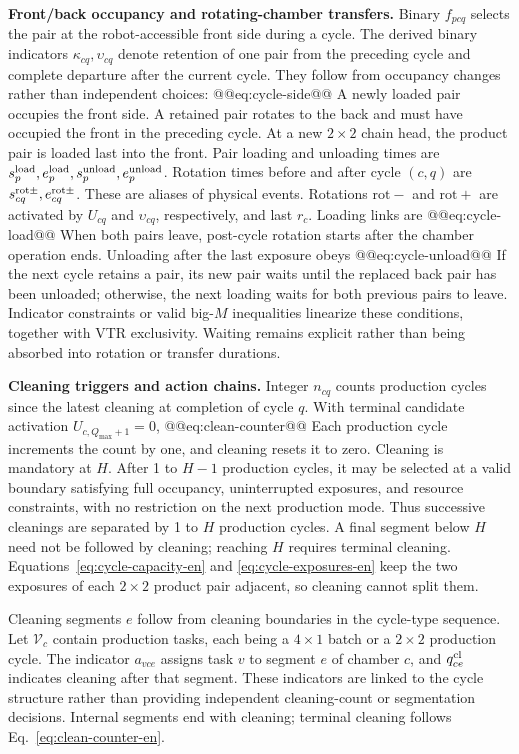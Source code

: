 \noindent\textbf{Front/back occupancy and rotating-chamber transfers.}
Binary $f_{pcq}$ selects the pair at the robot-accessible front side during a cycle. The derived binary indicators $\kappa_{cq},\upsilon_{cq}$ denote retention of one pair from the preceding cycle and complete departure after the current cycle. They follow from occupancy changes rather than independent choices:
@@eq:cycle-side@@
A newly loaded pair occupies the front side. A retained pair rotates to the back and must have occupied the front in the preceding cycle. At a new $2\times2$ chain head, the product pair is loaded last into the front. Pair loading and unloading times are $s_p^{\rm load},e_p^{\rm load},s_p^{\rm unload},e_p^{\rm unload}$. Rotation times before and after cycle $(c,q)$ are $s_{cq}^{\rm rot\pm},e_{cq}^{\rm rot\pm}$. These are aliases of physical events. Rotations $\mathrm{rot-}$ and $\mathrm{rot+}$ are activated by $U_{cq}$ and $\upsilon_{cq}$, respectively, and last $r_c$. Loading links are
@@eq:cycle-load@@
When both pairs leave, post-cycle rotation starts after the chamber operation ends. Unloading after the last exposure obeys
@@eq:cycle-unload@@
If the next cycle retains a pair, its new pair waits until the replaced back pair has been unloaded; otherwise, the next loading waits for both previous pairs to leave. Indicator constraints or valid big-$M$ inequalities linearize these conditions, together with VTR exclusivity. Waiting remains explicit rather than being absorbed into rotation or transfer durations.

\noindent\textbf{Cleaning triggers and action chains.}
Integer $n_{cq}$ counts production cycles since the latest cleaning at completion of cycle $q$. With terminal candidate activation $U_{c,Q_{\max}+1}=0$,
@@eq:clean-counter@@
Each production cycle increments the count by one, and cleaning resets it to zero. Cleaning is mandatory at $H$. After 1 to $H-1$ production cycles, it may be selected at a valid boundary satisfying full occupancy, uninterrupted exposures, and resource constraints, with no restriction on the next production mode. Thus successive cleanings are separated by 1 to $H$ production cycles. A final segment below $H$ need not be followed by cleaning; reaching $H$ requires terminal cleaning. Equations~\eqref{eq:cycle-capacity-en} and \eqref{eq:cycle-exposures-en} keep the two exposures of each $2\times2$ product pair adjacent, so cleaning cannot split them.

Cleaning segments $e$ follow from cleaning boundaries in the cycle-type sequence. Let $\mathcal V_c$ contain production tasks, each being a $4\times1$ batch or a $2\times2$ production cycle. The indicator $a_{vce}$ assigns task $v$ to segment $e$ of chamber $c$, and $q^{\rm cl}_{ce}$ indicates cleaning after that segment. These indicators are linked to the cycle structure rather than providing independent cleaning-count or segmentation decisions. Internal segments end with cleaning; terminal cleaning follows Eq.~\eqref{eq:clean-counter-en}.

